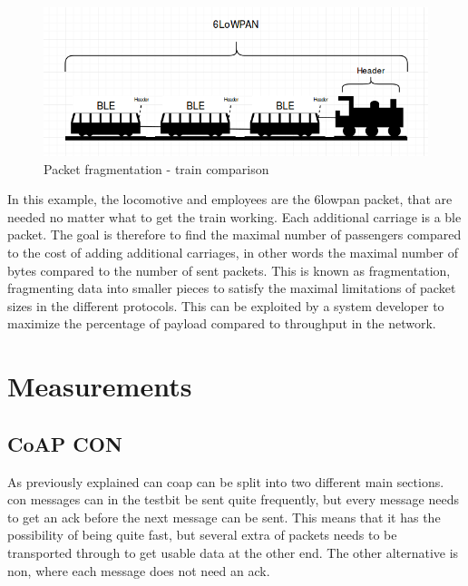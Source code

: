 \begin{figure}[ht]
    \centering
    \includegraphics[scale=0.5]{trainExample.png}    
    \caption{Packet fragmentation - train comparison}
    \label{fig:trainExample}
\end{figure}

\noindent In this example, the locomotive and employees are the \gls{6lowpan} packet, that are needed no matter what to get the train working. Each additional carriage is a \gls{ble} packet. The goal is therefore to find the maximal number of passengers compared to the cost of adding additional carriages, in other words the maximal number of bytes compared to the number of sent packets. This is known as fragmentation, fragmenting data into smaller pieces to satisfy the maximal limitations of packet sizes in the different protocols. This can be exploited by a system developer to maximize the percentage of \gls{payload} compared to \gls{throughput} in the network.
 
\newpage

\section{Measurements}

\subsection{CoAP CON}

\noindent As previously explained can \gls{coap} can be split into two different main sections. \gls{con} messages can in the testbit be sent quite frequently, but every message needs to get an \gls{ack} before the next message can be sent. This means that it has the possibility of being quite fast, but several extra of packets needs to be transported through to get usable data at the other end. The other alternative is \gls{non}, where each message does not need an \gls{ack}. 





